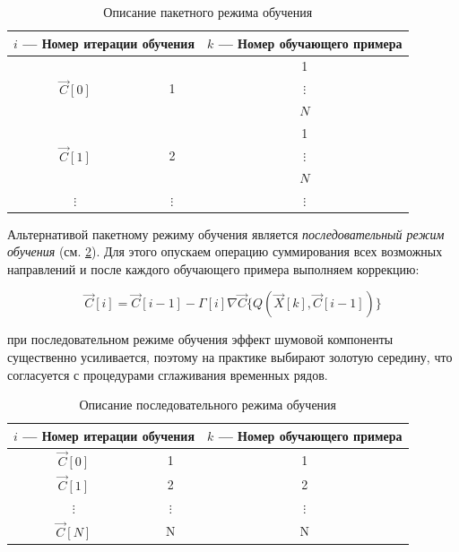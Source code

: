 \documentclass{article}
\numberwithin{equation}{subsection}
\begin{document}
\begin{table}[htbp]
    \centering
    \caption{Описание пакетного режима обучения}
    \label{table:packet_training}
    \begin{tabular}{c c | c}
        \multicolumn{2}{c}{$i$ --- Номер итерации обучения} & $k$ --- Номер обучающего примера \\\hline
        \multirow{3}{*}{$\vec{C}[0]$} & \multirow{3}{*}{1}  & 1 \\\cline{3-3}
                                      &                     & $\vdots$\\\cline{3-3}
                                      &                     & $N$ \\\hline
        \multirow{3}{*}{$\vec{C}[1]$} & \multirow{3}{*}{2}  & 1 \\\cline{3-3}
                                      &                     & $\vdots$\\\cline{3-3}
                                      &                     & $N$ \\\hline
        $\vdots$                      & $\vdots$            & $\vdots$ \\\hline
    \end{tabular}
\end{table}

Альтернативой пакетному режиму обучения является \textit{последовательный режим обучения}
(см. \ref{table:seq_training}).
Для этого опускаем операцию суммирования всех возможных направлений и после каждого
обучающего примера выполняем коррекцию:

\begin{equation}
    \vec{C}[i] = \vec{C}[i-1] - \Gamma[i] \nabla\vec{C} \{ Q(\vec{X}[k], \vec{C}[i-1]) \}
\end{equation}

при последовательном режиме обучения эффект шумовой компоненты существенно 
усиливается, поэтому на практике выбирают \glqq золотую середину\grqq, что
согласуется с процедурами сглаживания временных рядов.

\begin{table}[htbp]
    \centering
    \caption{Описание последовательного режима обучения}
    \label{table:seq_training}
    \begin{tabular}{c c | c}
        \multicolumn{2}{c}{$i$ --- Номер итерации обучения} & $k$ --- Номер обучающего примера \\\hline
        $\vec{C}[0]$                  & 1                   & 1 \\\hline
        $\vec{C}[1]$                  & 2                   & 2 \\\hline
        $\vdots$                      & $\vdots$            & $\vdots$\\\hline
        $\vec{C}[N]$                  & N                   & N \\\hline
    \end{tabular}
\end{table}
\end{document}
